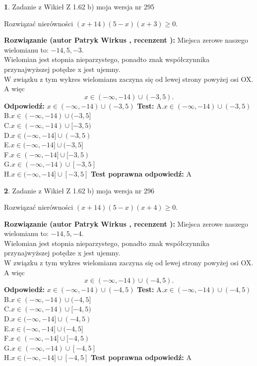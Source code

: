 \documentclass[12pt, a4paper]{article}
\theoremstyle{definition} %
\newtheorem{zad}{}
\newcommand{\zadStart}[1]{\begin{zad}#1\newline}
\newcommand{\zadStop}{\end{zad}}
\newcommand{\rozwStart}[2]{\noindent \textbf{Rozwiązanie (autor #1 , recenzent #2): }\newline}
\newcommand{\rozwStop}{\newline}
\newcommand{\odpStart}{\noindent \textbf{Odpowiedź:}\newline}
\newcommand{\odpStop}{\newline}
\newcommand{\testStart}{\noindent \textbf{Test:}\newline}
\newcommand{\testStop}{\newline}
\newcommand{\kluczStart}{\noindent \textbf{Test poprawna odpowiedź:}\newline}
\newcommand{\kluczStop}{\newline}
\begin{document}
\zadStart{Zadanie z Wikieł Z 1.62 b) moja wersja nr 295}

Rozwiązać nierówności $(x+14)(5-x)(x+3)\ge0$.
\zadStop
\rozwStart{Patryk Wirkus}{}
Miejsca zerowe naszego wielomianu to: $-14, 5, -3$.\\
Wielomian jest stopnia nieparzystego, ponadto znak współczynnika przy\linebreak najwyższej potędze x jest ujemny.\\ W związku z tym wykres wielomianu zaczyna się od lewej strony powyżej osi OX. A więc $$x \in (-\infty,-14) \cup (-3,5).$$
\rozwStop
\odpStart
$x \in (-\infty,-14) \cup (-3,5)$
\odpStop
\testStart
A.$x \in (-\infty,-14) \cup (-3,5)$\\
B.$x \in (-\infty,-14) \cup (-3,5]$\\
C.$x \in (-\infty,-14) \cup [-3,5)$\\
D.$x \in (-\infty,-14] \cup (-3,5)$\\
E.$x \in (-\infty,-14] \cup (-3,5]$\\
F.$x \in (-\infty,-14] \cup [-3,5)$\\
G.$x \in (-\infty,-14) \cup [-3,5]$\\
H.$x \in (-\infty,-14] \cup [-3,5]$
\testStop
\kluczStart
A
\kluczStop



\zadStart{Zadanie z Wikieł Z 1.62 b) moja wersja nr 296}

Rozwiązać nierówności $(x+14)(5-x)(x+4)\ge0$.
\zadStop
\rozwStart{Patryk Wirkus}{}
Miejsca zerowe naszego wielomianu to: $-14, 5, -4$.\\
Wielomian jest stopnia nieparzystego, ponadto znak współczynnika przy\linebreak najwyższej potędze x jest ujemny.\\ W związku z tym wykres wielomianu zaczyna się od lewej strony powyżej osi OX. A więc $$x \in (-\infty,-14) \cup (-4,5).$$
\rozwStop
\odpStart
$x \in (-\infty,-14) \cup (-4,5)$
\odpStop
\testStart
A.$x \in (-\infty,-14) \cup (-4,5)$\\
B.$x \in (-\infty,-14) \cup (-4,5]$\\
C.$x \in (-\infty,-14) \cup [-4,5)$\\
D.$x \in (-\infty,-14] \cup (-4,5)$\\
E.$x \in (-\infty,-14] \cup (-4,5]$\\
F.$x \in (-\infty,-14] \cup [-4,5)$\\
G.$x \in (-\infty,-14) \cup [-4,5]$\\
H.$x \in (-\infty,-14] \cup [-4,5]$
\testStop
\kluczStart
A
\kluczStop
\end{document}
